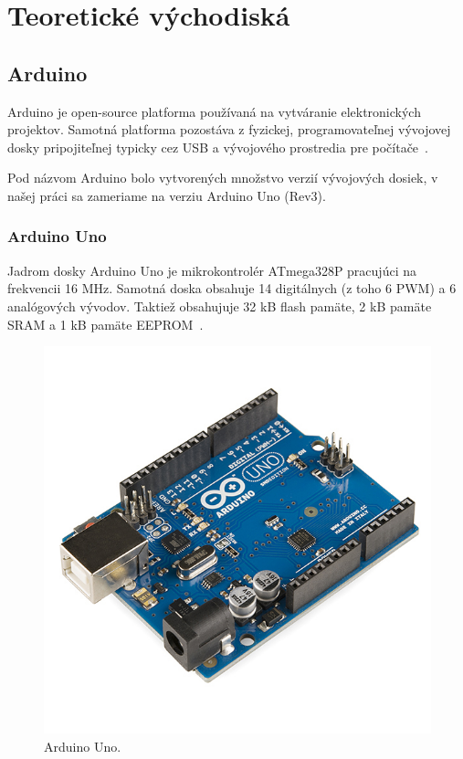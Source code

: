 \chapter{Teoretické východiská}

\section{Arduino}
Arduino je open-source platforma používaná na vytváranie elektronických projektov. Samotná platforma pozostáva z fyzickej, programovateľnej vývojovej dosky pripojiteľnej typicky cez USB a vývojového prostredia pre počítače~\cite{maly-hvj}.

Pod názvom Arduino bolo vytvorených množstvo verzií vývojových dosiek, v našej práci sa zameriame na verziu Arduino Uno (Rev3).

\subsection{Arduino Uno}
Jadrom dosky Arduino Uno je mikrokontrolér ATmega328P pracujúci na frekvencii 16 MHz. Samotná doska obsahuje 14 digitálnych (z toho 6 PWM) a 6 analógových vývodov. Taktiež obsahujuje 32 kB flash pamäte, 2 kB pamäte SRAM a 1 kB pamäte EEPROM~\cite{arduino-uno}.

\begin{figure}
    \centering
    \includegraphics{img/Arduino_Uno.jpg}
    \caption{Arduino Uno.}
\end{figure}

